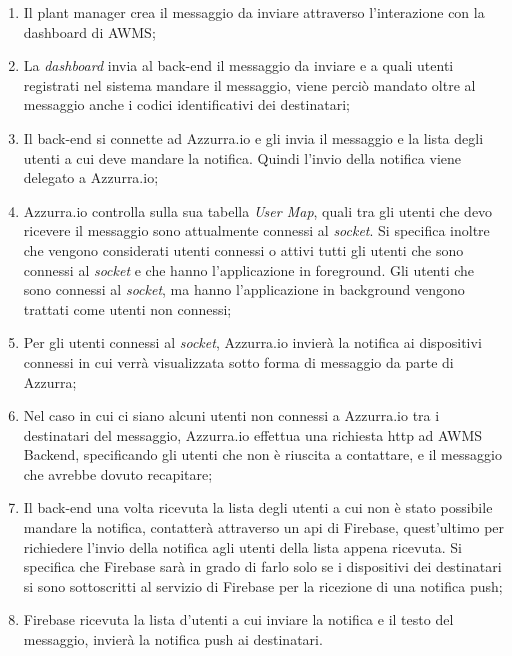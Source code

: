 \begin{enumerate}
	\item Il \gls{plant manager}\ap{[g]} crea il messaggio da inviare attraverso l'interazione con la dashboard di \gls{AWMS};
	\item La \emph{dashboard} invia al back-end il messaggio da inviare e a quali utenti registrati nel sistema mandare il messaggio, viene perciò mandato oltre al messaggio anche i codici identificativi dei destinatari;
	\item Il back-end si connette ad Azzurra.io e gli invia il messaggio e la lista degli utenti a cui deve mandare la notifica. Quindi l'invio della notifica viene delegato a Azzurra.io; 
	\item Azzurra.io controlla sulla sua tabella \emph{User Map}, quali tra gli utenti che devo ricevere il messaggio sono attualmente connessi al \emph{socket}. Si specifica inoltre che vengono considerati utenti connessi o attivi tutti gli utenti che sono connessi al \emph{socket} e che hanno l’applicazione in \gls{foreground}\ap{[g]}. Gli utenti che sono connessi al \emph{socket}, ma hanno l’applicazione in \gls{background}\ap{[g]} vengono trattati come utenti non connessi;
	\item Per gli utenti connessi al \emph{socket}, Azzurra.io invierà la notifica ai dispositivi connessi in cui verrà visualizzata sotto forma di messaggio da parte di Azzurra;
	\item Nel caso in cui ci siano alcuni utenti non connessi a Azzurra.io tra i destinatari del messaggio, Azzurra.io effettua una richiesta \gls{http}\ap{[g]} ad AWMS Backend, specificando gli utenti che non è riuscita a contattare, e il messaggio che avrebbe dovuto recapitare;
	\item Il back-end una volta ricevuta la lista degli utenti a cui non è stato possibile mandare la notifica, contatterà attraverso un \gls{api}\ap{[g]} di Firebase, quest'ultimo per richiedere l'invio della notifica agli utenti della lista appena ricevuta. Si specifica che Firebase sarà in grado di farlo solo se i dispositivi dei destinatari si sono sottoscritti al servizio di Firebase per la ricezione di una \gls{notifica push}\ap{[g]};
	\item Firebase ricevuta la lista d'utenti a cui inviare la notifica e il testo del messaggio, invierà la \gls{notifica push}\ap{[g]} ai destinatari.
\end{enumerate}